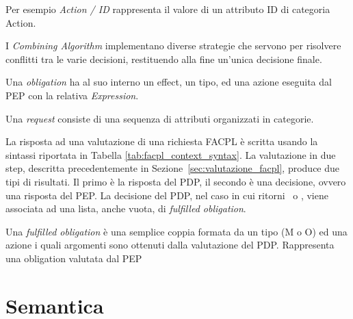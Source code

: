 Per esempio \textit{Action / ID} rappresenta il valore di un attributo ID di categoria Action. \par
I \textit{Combining Algorithm} implementano diverse strategie che servono per risolvere conflitti tra le varie decisioni, restituendo alla fine un'unica decisione finale. \par
Una \textit{obligation} ha al suo interno un effect, un tipo, ed una azione eseguita dal PEP con la relativa \textit{Expression}. \par
Una \textit{request} consiste di una sequenza di attributi organizzati in categorie.\\ \par
La risposta ad una valutazione di una richiesta FACPL è scritta usando la sintassi riportata in Tabella \ref{tab:facpl_context_syntax}.
La valutazione in due step, descritta precedentemente in Sezione~\ref{sec:valutazione_facpl}, produce due tipi di risultati. Il primo è la risposta del PDP, il secondo è una decisione, ovvero una risposta del PEP.
La decisione del PDP, nel caso in cui ritorni \permit \ o \deny, viene associata ad una lista, anche vuota, di \textit{fulfilled obligation}. \par
Una \textit{fulfilled obligation} è una semplice coppia formata da un tipo (M o O) ed una azione i quali argomenti sono ottenuti dalla valutazione del PDP. Rappresenta una obligation valutata dal \ac{PEP}

\section{Semantica}
\label{sec:semantica_originale}

